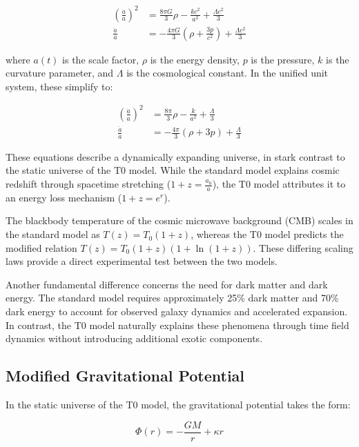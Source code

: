 \documentclass[12pt,a4paper]{article}
\begin{document}
	\begin{align}
		\left(\frac{\dot{a}}{a}\right)^2 &= \frac{8\pi G}{3}\rho - \frac{kc^2}{a^2} + \frac{\Lambda c^2}{3} \\
		\frac{\ddot{a}}{a} &= -\frac{4\pi G}{3}\left(\rho + \frac{3p}{c^2}\right) + \frac{\Lambda c^2}{3}
	\end{align}
	
	where \(a(t)\) is the scale factor, \(\rho\) is the energy density, \(p\) is the pressure, \(k\) is the curvature parameter, and \(\Lambda\) is the cosmological constant. In the unified unit system, these simplify to:
	
	\begin{align}
		\left(\frac{\dot{a}}{a}\right)^2 &= \frac{8\pi}{3}\rho - \frac{k}{a^2} + \frac{\Lambda}{3} \\
		\frac{\ddot{a}}{a} &= -\frac{4\pi}{3}(\rho + 3p) + \frac{\Lambda}{3}
	\end{align}
	
	These equations describe a dynamically expanding universe, in stark contrast to the static universe of the T0 model. While the standard model explains cosmic redshift through spacetime stretching (\(1+z = \frac{a_0}{a}\)), the T0 model attributes it to an energy loss mechanism (\(1+z = e^r\)).
	
	The blackbody temperature of the cosmic microwave background (CMB) scales in the standard model as \(T(z) = T_0(1+z)\), whereas the T0 model predicts the modified relation \(T(z) = T_0(1+z)(1+\ln(1+z))\). These differing scaling laws provide a direct experimental test between the two models.
	
	Another fundamental difference concerns the need for dark matter and dark energy. The standard model requires approximately 25\% dark matter and 70\% dark energy to account for observed galaxy dynamics and accelerated expansion. In contrast, the T0 model naturally explains these phenomena through time field dynamics without introducing additional exotic components.
	
	\subsection{Modified Gravitational Potential}
	\label{subsec:modified_potential}
	In the static universe of the T0 model, the gravitational potential takes the form:
	
	\begin{equation}
		\label{eq:modified_potential}
		\Phi(r) = -\frac{GM}{r} + \kappa r
	\end{equation}
	
\end{document}
